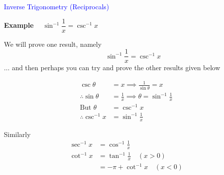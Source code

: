 \documentclass[14pt,fleqn]{extarticle}
\begin{document}
\begin{skill}
\begin{narrow}
\textcolor{blue}{Inverse Trigonometry (Reciprocals)}

\small{\textbf{Example} }$\quad \sin^{-1}\dfrac{1}{x} = \csc^{-1} x$
\end{narrow}

\reason 

We will prove one result, namely
\[ \qquad \sin^{-1}\frac{1}{x} = \csc^{-1} x\]
$\ldots$ and then perhaps you can try and prove the other results given below

%
\begin{align}
\csc\theta &= x \implies \frac{1}{\sin\theta} =x \\
\therefore \sin\theta &= \frac{1}{x} 
\implies \theta = \sin^{-1}\frac{1}{x} \\
\text{But }\theta &= \csc^{-1} x \\
\therefore \csc^{-1}x &= \sin^{-1}\frac{1}{x} 
\end{align}

Similarly 
%
\begin{align}
\sec^{-1} x &= \cos^{-1}\frac{1}{x} \\ 
\cot^{-1} x &= \tan^{-1}\frac{1}{x} \quad (x >  0) \\
&= -\pi + \cot^{-1} x \quad (x < 0) 
\end{align}

\end{skill}
\end{document}
